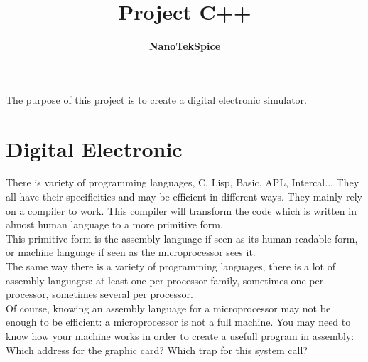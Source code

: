 \documentclass{koala-en}
\begin{document}
\title{\textbf{Project C++}}
\subtitle{\textbf{NanoTekSpice}}

\summary
{
  The purpose of this project is to create a digital electronic simulator.
}

\maketitle

\tableofcontents

\renewcommand{\labelitemi}{$\bullet$}
\renewcommand{\labelitemii}{$\circ$}


\chapter{Digital Electronic}

        There is variety of programming languages, C, Lisp, Basic, APL, Intercal...
They all have their specificities and may be efficient in different ways.
They mainly rely on a compiler to work. This compiler will transform
the code which is written in almost human language to a more primitive form.\\

This primitive form is the assembly language if seen as its human readable form,
or machine language if seen as the microprocessor sees it.\\

The same way there is a variety of programming languages, there is a lot of
assembly languages: at least one per processor family, sometimes one per processor,
sometimes several per processor.\\

Of course, knowing an assembly language for a microprocessor may not be enough
to be efficient: a microprocessor is not a full machine. You may need to know
how your machine works in order to create a usefull program in assembly:
Which address for the graphic card? Which trap for this system call?\\
\end{document}

